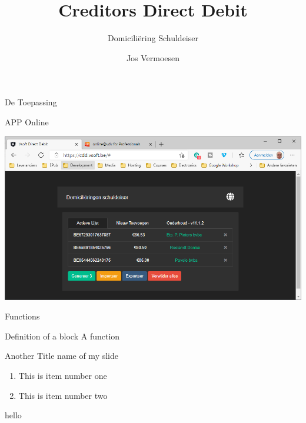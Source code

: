 \documentclass{beamer}
\title[
  CDD Slide
  \insertframenumber/\inserttotalframenumber
  ]{Creditors Direct Debit}
\subtitle{Domiciliëring Schuldeiser}
\author{Jos Vermoesen}
\institute{Vsoft Administratieve Software}
\date{}
\begin{document}
\begin{frame}
  \begin{titlepage}
  \end{titlepage}
\end{frame}


\begin{frame}[t]{De Toepassing}
  \begin{block}{APP Online}
    \vspace{0.5em}
    \begin{center}
      \includegraphics[scale=0.4]{cddscreen}
    \end{center}
    \vspace{0.5em}
  \end{block}
\end{frame}

\begin{frame}[t]{Functions}\vspace{10pt}
  \begin{block}{Definition of a block}\vspace{0.5em}
    A function
  \end{block}
\end{frame}

\begin{frame}[t]{Another Title name of my slide}\vspace{10pt}
  \begin{enumerate}
    \item This is item number one
    \item This is item number two
  \end{enumerate}
\end{frame}

\begin{frame}
  hello
\end{frame}
\end{document}
